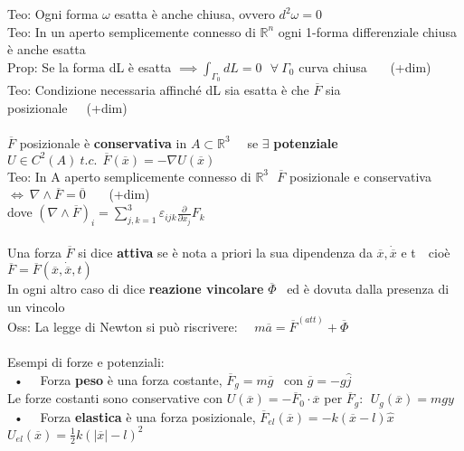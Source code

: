 \documentclass{article}
\begin{document}
%
%
%
Teo: Ogni forma $\omega$ esatta è anche chiusa, ovvero $d^2\omega = 0$\\
Teo: In un aperto semplicemente connesso di $\mathbb{R}^n$ ogni 1-forma differenziale chiusa è anche esatta\\ 
%
Prop: Se la forma dL è esatta $\implies \int_{\Gamma_0} dL = 0 \ \ \ \forall \ \Gamma_0$ curva chiusa \ \ \ (+dim)\\ 
%
Teo: Condizione necessaria affinché dL sia esatta è che $\overline{F}$ sia posizionale\ \ \ (+dim)\\ \\
%
%
%
$\overline{F}$ posizionale è \textbf{conservativa} in $A\subset\mathbb{R}^3$ \ \ se $\exists$ \textbf{potenziale} $U\in C^2(A) \ t.c. \ \ \overline{F}(\overline{x})=-\nabla U(\overline{x})$\\
Teo: In A aperto semplicemente connesso di $\mathbb{R}^3 \ \ \ \overline{F}$ posizionale e conservativa $\Leftrightarrow \ \nabla \wedge \overline{F} = \overline{0}$ \ \ \ (+dim)\\
\phantom{} \hspace{0.23in} dove $(\nabla\wedge\overline{F})_i = \sum^3_{j,k=1} \varepsilon_{ijk} \frac{\partial}{\partial x_j}F_k$ \\ \\
%
%
%
Una forza $\overline{F}$ si dice \textbf{attiva} se è nota a priori la sua dipendenza da $\overline{x}, \dot{\overline{x}}$ e t\ \ cioè $\overline{F}=\overline{F}(\overline{x},\dot{\overline{x}},t)$ \\
In ogni altro caso di dice \textbf{reazione vincolare} $\overline{\Phi}$ \ ed è dovuta dalla presenza di un vincolo\\
%
Oss: La legge di Newton si può riscrivere: \ \ $m\overline{a} = \overline{F}^{(att)} + \overline{\Phi}$ \\ \\
%
% 
%
Esempi di forze e potenziali:\\
\ • \ \ Forza \textbf{peso} è una forza costante, $\overline{F}_g=m\overline{g}$ \ con $\overline{g}=-g\hat{j}$\\
\phantom{} \hspace{0.18in} Le forze costanti sono conservative con $U(\overline{x})=-\overline{F}_0\cdot\overline{x}$ \hspace{0.18in} per $\overline{F}_g: \ \ U_g(\overline{x})= mgy$\\
%
\ • \ \ Forza \textbf{elastica} è una forza posizionale, $\overline{F}_{el}(\overline{x})=-k(\overline{x}-l)\hat{x}$ \hspace{0.18in} $U_{el}(\overline{x})=\frac{1}{2}k(|\overline{x}|-l)^2$\\
\end{document}
